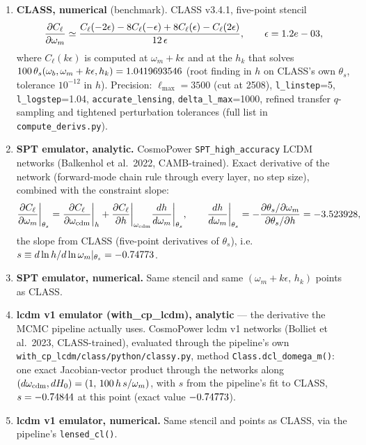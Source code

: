 \documentclass[10pt]{article}
\newcommand{\om}{\omega_m}
\begin{document}
\begin{enumerate}
\item \textbf{CLASS, numerical} (benchmark). CLASS v3.4.1, five-point stencil
  \begin{equation}
    \frac{\partial C_\ell}{\partial\om}\simeq\frac{C_\ell(-2\epsilon)-8C_\ell(-\epsilon)+8C_\ell(\epsilon)-C_\ell(2\epsilon)}{12\,\epsilon},
    \qquad \epsilon=\eps,
  \end{equation}
  where $C_\ell(k\epsilon)$ is computed at $\om+k\epsilon$ and at the $h_k$ that solves
  $100\,\theta_s(\omega_b,\om+k\epsilon,h_k)=\thetafid$ (root finding in $h$ on CLASS's own $\theta_s$,
  tolerance $10^{-12}$ in $h$). Precision: $\ell_{\max}=3500$ (cut at 2508), \texttt{l\_linstep}=5,
  \texttt{l\_logstep}=1.04, \texttt{accurate\_lensing}, \texttt{delta\_l\_max}=1000, refined transfer
  $q$-sampling and tightened perturbation tolerances (full list in \texttt{compute\_derivs.py}).
\item \textbf{SPT emulator, analytic.} CosmoPower \texttt{SPT\_high\_accuracy} LCDM networks
  (Balkenhol et al.\ 2022, CAMB-trained). Exact derivative of the network (forward-mode chain rule through every
  layer, no step size), combined with the constraint slope:
  \begin{equation}
    \frac{\partial C_\ell}{\partial\om}\bigg|_{\theta_s}=\frac{\partial C_\ell}{\partial\omega_{\rm cdm}}\bigg|_h
      +\frac{\partial C_\ell}{\partial h}\bigg|_{\omega_{\rm cdm}}\frac{dh}{d\om}\bigg|_{\theta_s},\qquad
    \frac{dh}{d\om}\bigg|_{\theta_s}=-\frac{\partial\theta_s/\partial\om}{\partial\theta_s/\partial h}=\slope ,
  \end{equation}
  the slope from CLASS (five-point derivatives of $\theta_s$), i.e.\ $s\equiv d\ln h/d\ln\om|_{\theta_s}=\sexact$.
\item \textbf{SPT emulator, numerical.} Same stencil and same $(\om+k\epsilon,\,h_k)$ points as CLASS.
\item \textbf{lcdm v1 emulator (with\_cp\_lcdm), analytic} --- the derivative the MCMC pipeline actually uses.
  CosmoPower lcdm v1 networks (Bolliet et al.\ 2023, CLASS-trained), evaluated through the pipeline's own
  \texttt{with\_cp\_lcdm/class/python/classy.py}, method \texttt{Class.dcl\_domega\_m()}: one exact
  Jacobian-vector product through the networks along $(d\omega_{\rm cdm},dH_0)=(1,\,100\,h\,s/\om)$, with
  $s$ from the pipeline's fit to CLASS, $s=-0.74844$ at this point (exact value $-0.74773$).
\item \textbf{lcdm v1 emulator, numerical.} Same stencil and points as CLASS, via the pipeline's \texttt{lensed\_cl()}.
\end{enumerate}
\end{document}
